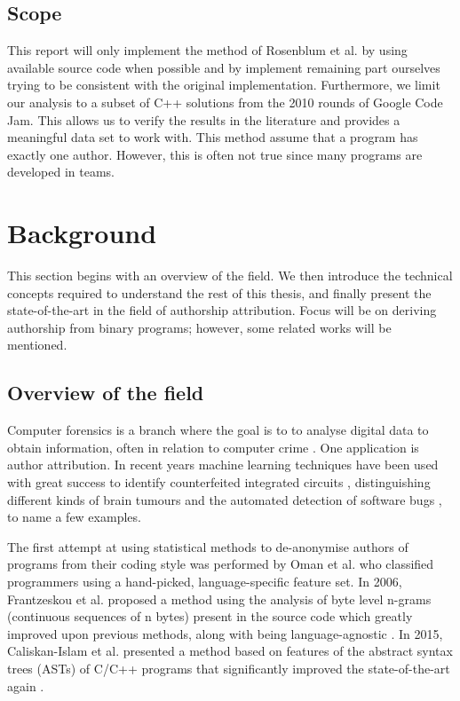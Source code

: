\documentclass[a4paper,11pt]{kth-mag}
\begin{document}
\section{Scope}
This report will only implement the method of Rosenblum et al. by using
available source code when possible and by implement remaining part ourselves
trying to be consistent with the original implementation.  Furthermore, we
limit our analysis to a subset of C++ solutions from the 2010 rounds of Google
Code Jam. This allows us to verify the results in the literature
\parencite{rosenblum2011wrote} and provides a meaningful data set to work with.
This method assume that a program has exactly one author. However, this is
often not true since many programs are developed in teams.

\chapter{Background}
This section begins with an overview of the field. We then introduce the
technical concepts required to understand the rest of this thesis, and finally
present the state-of-the-art in the field of authorship attribution. Focus will
be on deriving authorship from binary programs; however, some related works
will be mentioned.

\section{Overview of the field}
Computer forensics is a branch where the goal is to to analyse digital data to
obtain information, often in relation to computer crime
\parencite{reith2002examination}.  One application is author attribution. In
recent years machine learning techniques have been used with great success to
identify counterfeited integrated circuits \parencite{huang2013counterfeit},
distinguishing different kinds of brain tumours
\parencite{zacharaki2009classification} and the automated detection of software
bugs \parencite{aleem2015comparative}, to name a few examples.

The first attempt at using statistical methods to de-anonymise authors of
programs from their coding style was performed by Oman et al.
\parencite{oman1989programming} who classified programmers using a hand-picked,
language-specific feature set. In 2006, Frantzeskou et al. proposed a method
using the analysis of byte level n-grams (continuous sequences of n bytes)
present in the source code which greatly improved upon previous methods, along
with being language-agnostic \parencite{frantzeskou2006source}. In 2015,
Caliskan-Islam et al. presented a method based on features of the abstract
syntax trees (ASTs) of C/C++ programs that significantly improved the
state-of-the-art again \parencite{caliskan2015anonymizing}.
 
\end{document}
